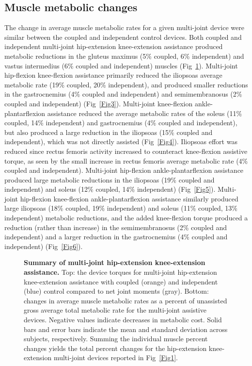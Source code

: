 \documentclass[10pt,letterpaper]{article}
\begin{document}
\subsection*{Muscle metabolic changes}
The change in average muscle metabolic rates for a given multi-joint device were similar between the coupled and independent control devices. Both coupled and independent multi-joint hip-extension knee-extension assistance produced metabolic reductions in the gluteus maximus (5\% coupled, 6\% independent) and vastus intermedius (6\% coupled and independent) muscles (Fig~\ref{Fig2}). Multi-joint hip-flexion knee-flexion assistance primarily reduced the iliopsoas average metabolic rate (19\% coupled, 20\% independent), and produced smaller reductions in the gastrocnemius (4\% coupled and independent) and semimembranosus (2\% coupled and independent) (Fig~\ref{Fig3}). Multi-joint knee-flexion ankle-plantarflexion assistance reduced the average metabolic rates of the soleus (11\% coupled, 14\% independent) and gastrocnemius (4\% coupled and independent), but also produced a large reduction in the iliopsoas (15\% coupled and independent), which was not directly assisted (Fig~\ref{Fig4}). Iliopsoas effort was reduced since rectus femoris activity increased to counteract knee-flexion assistive torque, as seen by the small increase in rectus femoris average metabolic rate (4\% coupled and independent). Multi-joint hip-flexion ankle-plantarflexion assistance produced large metabolic reductions in the iliopsoas (19\% coupled and independent) and soleus (12\% coupled, 14\% independent) (Fig~\ref{Fig5}). Multi-joint hip-flexion knee-flexion ankle-plantarflexion assistance similarly produced large iliopsoas (18\% coupled, 19\% independent) and soleus (11\% coupled, 13\% independent) metabolic reductions, and the added knee-flexion torque produced a reduction (rather than increase) in the semimembranosus (2\% coupled and independent) and a larger reduction in the gastrocnemius (4\% coupled and independent) (Fig~\ref{Fig6}).

\begin{figure}[!h]
\begin{adjustwidth}{-1in}{0in} %
    \centering
    \caption{{\bf Summary of multi-joint hip-extension knee-extension assistance.}
        Top: the device torques for multi-joint hip-extension knee-extension assistance with coupled (orange) and independent (blue) control compared to net joint moments (gray). Bottom: changes in average muscle metabolic rates as a percent of unassisted gross average total metabolic rate for the multi-joint assistive devices. Negative values indicate decreases in metabolic cost. Solid bars and error bars indicate the mean and standard deviation across subjects, respectively. Summing the individual muscle percent changes yields the total percent changes for the hip-extension knee-extension multi-joint devices reported in Fig~\ref{Fig1}.}
\label{Fig2}
\end{adjustwidth}
\end{figure} 
\end{document}
